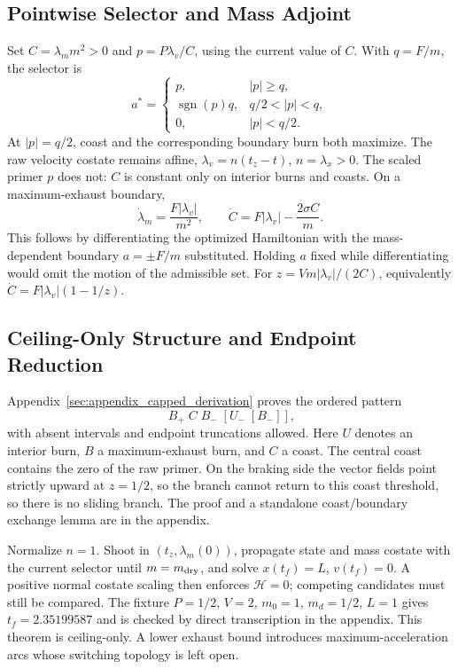 \documentclass[journal,a4paper]{IEEEtran}
\begin{document}
\subsection{Pointwise Selector and Mass Adjoint}
Set $C=\lambda_m m^2>0$ and $p=P\lambda_v/C$, using the current
value of $C$. With $q=F/m$, the selector is
\begin{equation}
 a^*=\begin{cases}
 p,&|p|\ge q,\\
 \operatorname{sgn}(p)q,&q/2<|p|<q,\\
 0,&|p|<q/2.
 \end{cases}
 \label{eq:capped_summary_selector}
\end{equation}
At $|p|=q/2$, coast and the corresponding boundary burn both maximize.
The raw velocity costate remains affine, $\lambda_v=n(t_z-t)$,
$n=\lambda_x>0$. The scaled primer $p$ does not: $C$ is constant
only on interior burns and coasts. On a maximum-exhaust boundary,
\begin{equation}
 \dot\lambda_m=\frac{F|\lambda_v|}{m^2},\qquad
 \dot C=F|\lambda_v|-\frac{2\sigma C}{m}.
 \label{eq:capped_corrected_adjoint}
\end{equation}
This follows by differentiating the optimized Hamiltonian with the
mass-dependent boundary $a=\pm F/m$ substituted. Holding $a$ fixed
while differentiating would omit the motion of the admissible set.
For $z=Vm|\lambda_v|/(2C)$, equivalently
$\dot C=F|\lambda_v|(1-1/z)$.

\subsection{Ceiling-Only Structure and Endpoint Reduction}
Appendix~\ref{sec:appendix_capped_derivation} proves the ordered pattern
\begin{equation}
 [U_+]\;B_+\;C\;B_-\;[U_-\;[B_-]],
 \label{eq:capped_summary_topology}
\end{equation}
with absent intervals and endpoint truncations allowed. Here $U$ denotes
an interior burn, $B$ a maximum-exhaust burn, and $C$ a coast. The central
coast contains the zero of the raw primer. On the braking side the
vector fields point strictly upward at $z=1/2$, so the branch
cannot return to this coast threshold, so there is no sliding branch.
The proof and a standalone coast/boundary exchange lemma are in the appendix.

Normalize $n=1$. Shoot in $(t_z,\lambda_m(0))$, propagate state and
mass costate with the current selector until $m=m_{\rm dry}$, and solve
$x(t_f)=L$, $v(t_f)=0$. A positive normal costate scaling then enforces
$\mathcal H=0$; competing candidates must still be compared. The
fixture $P=1/2$, $V=2$, $m_0=1$, $m_d=1/2$, $L=1$ gives
$t_f=2.35199587$ and is checked by direct transcription in the appendix.
This theorem is ceiling-only. A lower exhaust bound introduces
maximum-acceleration arcs whose switching topology is left open.
\end{document}
